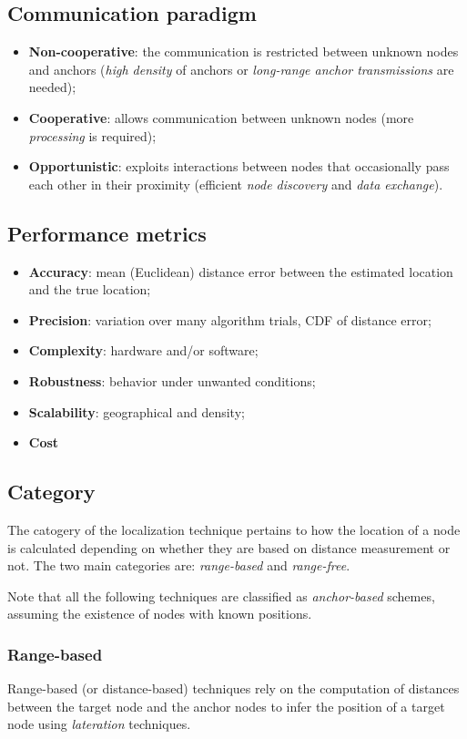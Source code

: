 \documentclass[a4paper,12pt]{article}
\begin{document}
\subsection{Communication paradigm}
\begin{itemize}
  \item \textbf{Non-cooperative}: the communication is restricted between unknown nodes and anchors (\textit{high density} of anchors or \textit{long-range anchor transmissions} are needed);
  \item \textbf{Cooperative}: allows communication between unknown nodes (more \textit{processing} is required);
  \item \textbf{Opportunistic}: exploits interactions between nodes that occasionally pass each other in their proximity (efficient \textit{node discovery} and \textit{data exchange}).
\end{itemize}

\subsection{Performance metrics}
\begin{itemize}
  \item \textbf{Accuracy}: mean (Euclidean) distance error between the estimated location and the true location;
  \item \textbf{Precision}: variation over many algorithm trials, CDF of distance error;
  \item \textbf{Complexity}: hardware and/or software;
  \item \textbf{Robustness}: behavior under unwanted conditions;
  \item \textbf{Scalability}: geographical and density;
  \item \textbf{Cost}
\end{itemize}

\subsection{Category}
The catogery of the localization technique pertains to how the location of a node is calculated depending on whether they are based on distance measurement or not. The two main categories are: \textit{range-based} and \textit{range-free}. 

Note that all the following techniques are classified as \textit{anchor-based} schemes, assuming the existence of nodes with known positions.

\subsubsection{Range-based}
Range-based (or distance-based) techniques rely on the computation of distances between the target node and the anchor nodes to infer the position of a target node using \textit{lateration} techniques.
\end{document}
